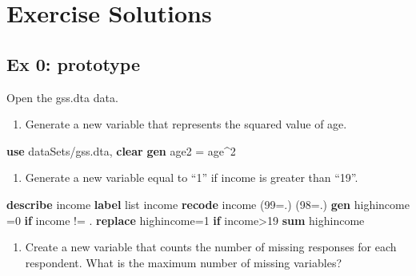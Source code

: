 \documentclass[]{book}
\newenvironment{Shaded}{\begin{snugshade}}{\end{snugshade}}
\newcommand{\KeywordTok}[1]{\textcolor[rgb]{0.13,0.29,0.53}{\textbf{#1}}}
\newcommand{\NormalTok}[1]{#1}
\newcommand{\OtherTok}[1]{\textcolor[rgb]{0.56,0.35,0.01}{#1}}
\providecommand{\tightlist}{%
  \setlength{\itemsep}{0pt}\setlength{\parskip}{0pt}}
\begin{document}
\hypertarget{exercise-solutions-7}{%
\section{Exercise Solutions}\label{exercise-solutions-7}}

\hypertarget{ex-0-prototype-7}{%
\subsection{Ex 0: prototype}\label{ex-0-prototype-7}}

Open the gss.dta data.

\begin{enumerate}
\def\labelenumi{\arabic{enumi}.}
\tightlist
\item
  Generate a new variable that represents the squared value of age.
\end{enumerate}

\begin{Shaded}
\begin{Highlighting}[]
     \KeywordTok{use}\NormalTok{ dataSets/gss.dta, }\KeywordTok{clear}
     \KeywordTok{gen}\NormalTok{ age2 = age^2}
\end{Highlighting}
\end{Shaded}

\begin{enumerate}
\def\labelenumi{\arabic{enumi}.}
\setcounter{enumi}{1}
\tightlist
\item
  Generate a new variable equal to ``1'' if income is greater than ``19''.
\end{enumerate}

\begin{Shaded}
\begin{Highlighting}[]
     \KeywordTok{describe}\NormalTok{ income}
     \KeywordTok{label} \OtherTok{list}\NormalTok{ income}
     \KeywordTok{recode}\NormalTok{ income (99=.) (98=.)}
     \KeywordTok{gen}\NormalTok{ highincome =0 }\KeywordTok{if}\NormalTok{ income != .}
     \KeywordTok{replace}\NormalTok{ highincome=1 }\KeywordTok{if}\NormalTok{ income>19}
     \KeywordTok{sum}\NormalTok{ highincome}
\end{Highlighting}
\end{Shaded}

\begin{enumerate}
\def\labelenumi{\arabic{enumi}.}
\setcounter{enumi}{2}
\tightlist
\item
  Create a new variable that counts the number of missing responses for each respondent. What is the maximum number of missing variables?
\end{enumerate}
\end{document}
